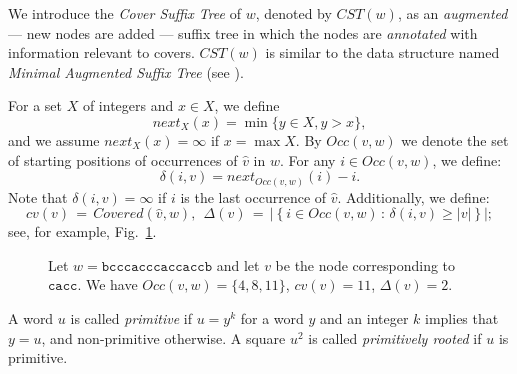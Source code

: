 \documentclass{article}
\theoremstyle{theorem}
\theoremstyle{definition}
\newcommand{\Covered}{\mathit{Covered}}
\newcommand{\CST}{\mathit{CST}}
\renewcommand{\next}{\mathit{next}}
\newcommand{\Occ}{\mathit{Occ}}
\renewcommand{\c}{\mathit{cv}}
\begin{document}
  We introduce the \emph{Cover Suffix Tree} of $w$, denoted by $\CST(w)$,
  as an \emph{augmented} --- new nodes are added --- suffix tree in which the
  nodes are \emph{annotated} with information relevant to covers. $\CST(w)$ is similar to the data structure named \emph{Minimal Augmented Suffix Tree}
  (see \cite{DBLP:journals/algorithmica/ApostolicoP96,DBLP:conf/icalp/BrodalLOP02}).

  For a set $X$ of integers and $x\in X$, we define
  $$\next_X(x)=\min\{y\in X, y>x\},$$
  and we assume $\next_X(x)=\infty$ if $x=\max X$.
  By $\Occ(v,w)$ we denote the set of starting positions of occurrences of $\hat{v}$ in $w$.
  For any $i \in \Occ(v,w)$, we define:
  $$\delta(i,v) = \next_{\Occ(v,w)}(i)-i.$$
  Note that $\delta(i,v)=\infty$ if $i$ is the last occurrence of $\hat{v}$.
  Additionally, we define:
  $$\c(v)\,=\, \Covered(\hat{v},w),\ \ \Delta(v)\,=\,  \big|\left\{i\in
  \Occ(v,w)\, :\, \delta(i,v)\ge |v|\right\}\big|;$$ see, for example,
  Fig.~\ref{fig:c_Delta}.

    \begin{figure}[htb]
      \centering
       \caption{\label{fig:c_Delta}
        Let $w=\texttt{bcccacccaccaccb}$ and let $v$ be the node corresponding to $\texttt{cacc}$.
        We have $\Occ(v,w)=\{4, 8, 11\}$, $\c(v) = 11$, $\Delta(v)=2$.
      }
    \end{figure}

  A word $u$ is called \emph{primitive} if $u=y^k$ for a word $y$ and an integer $k$ implies that $y=u$, and
  non-primitive otherwise.
  A square $u^2$ is called \emph{primitively rooted} if $u$ is primitive.
\end{document}

